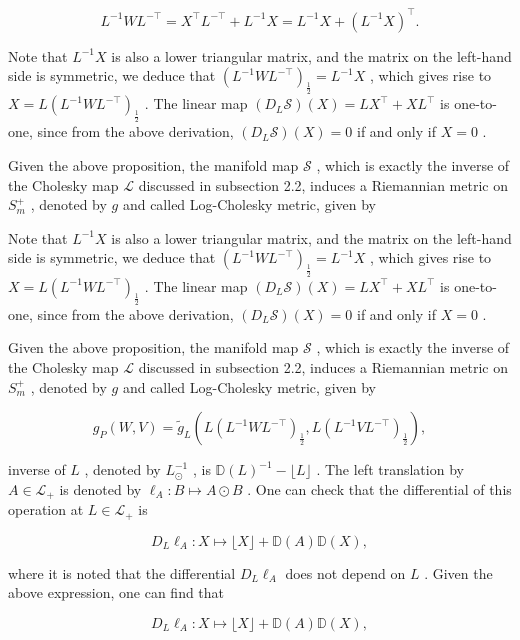 \documentclass[11pt]{article}
\begin{document}
$$
L ^ {- 1} W L ^ {- \top} = X ^ {\top} L ^ {- \top} + L ^ {- 1} X = L ^ {- 1} X + (L ^ {- 1} X) ^ {\top}.
$$

Note that  $L^{-1}X$  is also a lower triangular matrix, and the matrix on the left-hand side is symmetric, we deduce that  $(L^{-1}WL^{-\top})_{\frac{1}{2}} = L^{-1}X$ , which gives rise to  $X = L(L^{-1}WL^{-\top})_{\frac{1}{2}}$ . The linear map  $(D_L\mathcal{S})(X) = LX^\top +XL^\top$  is one-to-one, since from the above derivation,  $(D_L\mathcal{S})(X) = 0$  if and only if  $X = 0$ .

Given the above proposition, the manifold map  $\mathcal{S}$ , which is exactly the inverse of the Cholesky map  $\mathcal{L}$  discussed in subsection 2.2, induces a Riemannian metric on  $S_{m}^{+}$ , denoted by  $g$  and called Log-Cholesky metric, given by

Note that  $L^{-1}X$  is also a lower triangular matrix, and the matrix on the left-hand side is symmetric, we deduce that  $(L^{-1}WL^{-\top})_{\frac{1}{2}} = L^{-1}X$ , which gives rise to  $X = L(L^{-1}WL^{-\top})_{\frac{1}{2}}$ . The linear map  $(D_L\mathcal{S})(X) = LX^\top +XL^\top$  is one-to-one, since from the above derivation,  $(D_L\mathcal{S})(X) = 0$  if and only if  $X = 0$ .

Given the above proposition, the manifold map  $\mathcal{S}$ , which is exactly the inverse of the Cholesky map  $\mathcal{L}$  discussed in subsection 2.2, induces a Riemannian metric on  $S_{m}^{+}$ , denoted by  $g$  and called Log-Cholesky metric, given by

$$
g _ {P} (W, V) = \tilde {g} _ {L} \left(L \left(L ^ {- 1} W L ^ {- \top}\right) _ {\frac {1}{2}}, L \left(L ^ {- 1} V L ^ {- \top}\right) _ {\frac {1}{2}}\right), \tag {3.1}
$$

inverse of  $L$ , denoted by  $L_{\odot}^{-1}$ , is  $\mathbb{D}(L)^{-1} - \lfloor L\rfloor$ . The left translation by  $A\in \mathcal{L}_{+}$  is denoted by  $\ell_A:B\mapsto A\odot B$ . One can check that the differential of this operation at  $L\in \mathcal{L}_{+}$  is

$$
D _ {L} \ell_ {A}: X \mapsto \lfloor X \rfloor + \mathbb {D} (A) \mathbb {D} (X), \tag {3.2}
$$

where it is noted that the differential  $D_{L}\ell_{A}$  does not depend on  $L$ . Given the above expression, one can find that

$$
D _ {L} \ell_ {A}: X \mapsto \lfloor X \rfloor + \mathbb {D} (A) \mathbb {D} (X), \tag {3.2}
$$
\end{document}
